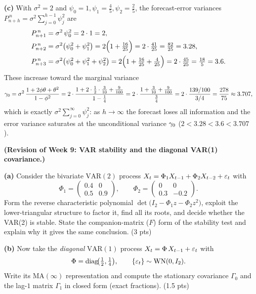\documentclass[11pt]{article}
\DeclareMathOperator{\diag}{diag}
\begin{document}
\textbf{(c)} With $\sigma^2=2$ and $\psi_0=1,\psi_1=\tfrac45,\psi_2=\tfrac25$, the forecast-error variances $P^{\,n}_{n+h}=\sigma^2\sum_{j=0}^{h-1}\psi_j^2$ are
\[
\begin{aligned}
P^{\,n}_{n+1}&=\sigma^2\,\psi_0^2=2\cdot1=2,\\
P^{\,n}_{n+2}&=\sigma^2\bigl(\psi_0^2+\psi_1^2\bigr)=2\Bigl(1+\tfrac{16}{25}\Bigr)=2\cdot\tfrac{41}{25}=\tfrac{82}{25}=3.28,\\
P^{\,n}_{n+3}&=\sigma^2\bigl(\psi_0^2+\psi_1^2+\psi_2^2\bigr)=2\Bigl(1+\tfrac{16}{25}+\tfrac{4}{25}\Bigr)=2\cdot\tfrac{45}{25}=\tfrac{18}{5}=3.6 .
\end{aligned}
\]
These increase toward the marginal variance
\[
\gamma_0=\sigma^2\,\frac{1+2\phi\theta+\theta^2}{1-\phi^2}
=2\cdot\frac{1+2\cdot\tfrac12\cdot\tfrac{3}{10}+\tfrac{9}{100}}{1-\tfrac14}
=2\cdot\frac{1+\tfrac{3}{10}+\tfrac{9}{100}}{\tfrac34}
=2\cdot\frac{139/100}{3/4}=\frac{278}{75}\approx3.707 ,
\]
which is exactly $\sigma^2\sum_{j=0}^\infty\psi_j^2$: as $h\to\infty$ the forecast loses all information and the error variance saturates at the unconditional variance $\gamma_0$ ($2<3.28<3.6<3.707$).

\statementstart
\textbf{(Revision of Week 9: VAR stability and the diagonal VAR(1) covariance.)}

\textbf{(a)} Consider the bivariate $\mathrm{VAR}(2)$ process $X_t=\Phi_1X_{t-1}+\Phi_2X_{t-2}+\varepsilon_t$ with
\[
\Phi_1=\begin{pmatrix}0.4 & 0\\[2pt] 0.5 & 0.9\end{pmatrix},\qquad
\Phi_2=\begin{pmatrix}0 & 0\\[2pt] 0.3 & -0.2\end{pmatrix}.
\]
Form the reverse characteristic polynomial $\det\bigl(I_2-\Phi_1 z-\Phi_2 z^2\bigr)$, exploit the lower-triangular structure to factor it, find all its roots, and decide whether the VAR(2) is stable. State the companion-matrix ($F$) form of the stability test and explain why it gives the same conclusion. \hfill(3 pts)

\textbf{(b)} Now take the \emph{diagonal} $\mathrm{VAR}(1)$ process $X_t=\Phi\,X_{t-1}+\varepsilon_t$ with
\[
\Phi=\diag\!\bigl(\tfrac12,\tfrac14\bigr),\qquad
\{\eps_t\}\sim\mathrm{WN}(0,I_2).
\]
Write its $\mathrm{MA}(\infty)$ representation and compute the stationary covariance $\Gamma_0$ and the lag-$1$ matrix $\Gamma_1$ in closed form (exact fractions). \hfill(1.5 pts)
\end{document}
